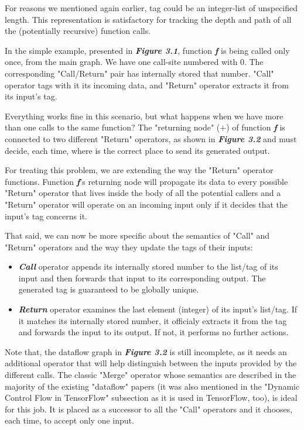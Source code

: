 \documentclass[ack,preface]{dithesis}
\begin{document}
For reasons we mentioned again earlier, tag could be an integer-list of unspecified length. This representation is satisfactory for tracking the depth and path of all the (potentially recursive) function calls.

In the simple example, presented in \textit{\textbf{Figure 3.1}}, function \textit{\textbf{f}} is being called only once, from the main graph. We have one call-site numbered with 0. The corresponding "Call/Return" pair has internally stored that number. "Call" operator tags with it its incoming data, and "Return" operator extracts it from its input's tag. 

Everything works fine in this scenario, but what happens when we have more than one calls to the same function? 
The "returning node" (+) of function  \textit{\textbf{f}} is connected to  two different "Return" operators, as shown in \textit{\textbf{Figure 3.2}} and must decide, each time,  where is the correct place to send its generated output.

For treating this problem, we are extending the way the "Return" operator functions.  Function \textit{\textbf{f}}'s returning node will  propagate its data to every possible "Return" operator that lives inside the body of all the potential callers and a "Return" operator will operate on an incoming input only if it decides that the input's tag concerns it.

That said, we can now be more specific about the semantics of  "Call" and "Return" operators and the way they update the tags of their inputs:
    \begin{itemize}
    \item \textit{\textbf{Call }} operator appends its internally stored number to the list/tag of its input and then forwards that input to its corresponding output. The generated tag is guaranteed to be globally unique.
    \item \textit{\textbf{Return }} operator examines the last element (integer) of its input's list/tag. If it matches its internally stored number, it officialy extracts it from the tag and forwards the input to its output. If not,  it performs no further actions.
    \end{itemize}

Note that, the dataflow graph in \textit{\textbf{Figure 3.2}} is still incomplete, as it needs an additional operator that will help distinguish between the inputs provided by the different calls. The classic "Merge" operator whose semantics are described in the majority of  the existing "dataflow" papers (it was also mentioned in the "Dynamic Control Flow in TensorFlow" subsection as it is used in TensorFlow, too), is ideal for this job. It is placed as a successor to all the "Call" operators and it chooses, each time, to accept only one input.
\end{document}
